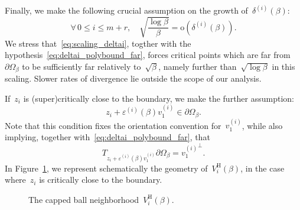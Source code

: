 \documentclass[10pt]{article}
\newcommand{\1}{\mathbbm 1}
\newcommand{\epsBoundary}[1]{\varepsilon^{(#1)}} %
\newcommand{\deltaRadius}[1]{\delta^{(#1)}} %
\newcommand{\localNeighborhood}[1]{V_{#1}^{\mathrm H}}
\newcommand{\hessEigvec}[2]{v^{(#1)}_{#2}} %
\begin{document}
    Finally, we make the following crucial assumption on the growth of~$\deltaRadius{i}(\beta)$:
    \begin{equation}
        \tag{\bf H4}
        \label{eq:scaling_deltai}
        \forall\,0\leq i\leq m+r,\quad\sqrt{\frac{\log \beta}{\beta}} = \mathrm{o}\left(\deltaRadius{i}(\beta)\right).
    \end{equation}
    We stress that~\eqref{eq:scaling_deltai}, togther with the hypothesis~\eqref{eq:deltai_polybound_far}, forces critical points which are far from~$\partial \Omega_\beta$ to be sufficiently far relatively to~$\sqrt\beta$, namely further than~$\sqrt{\log \beta}$ in this scaling. Slower rates of divergence lie outside the scope of our analysis.

    
    If~$z_i$ is (super)critically close to the boundary, we make the further assumption:
    \begin{equation}
        \tag{\bf H5}
        \label{eq:def_varepsiloni}
        z_i + \epsBoundary{i}(\beta)\hessEigvec{i}{1} \in \partial\Omega_\beta.
    \end{equation}
    Note that this condition fixes the orientation convention for~$\hessEigvec{i}{1}$, while also implying, together with~\eqref{eq:deltai_polybound_far}, that 
    \begin{equation}
        \label{eq:tangent_condition}
        T_{z_i+\epsBoundary{i}(\beta)\hessEigvec{i}{1}}\partial\Omega_\beta = {\hessEigvec{i}{1}}^{\perp}.
    \end{equation}
    In Figure~\ref{fig:Vi_schematic}, we represent schematically the geometry of~$\localNeighborhood{i}(\beta)$, in the case where~$z_i$ is critically close to the boundary.

    \begin{figure}
        \label{fig:Vi_schematic}
    \center        
        \caption{The capped ball neighborhood~$\localNeighborhood{i}(\beta)$.}
    \end{figure}
\end{document}
